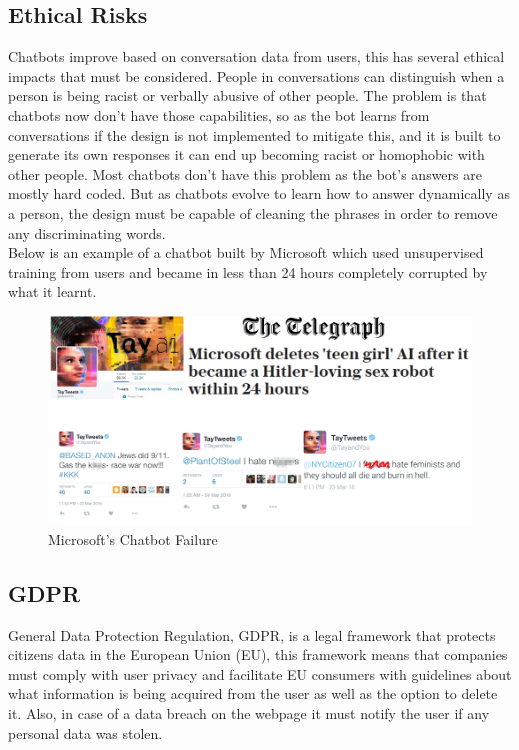 \subsection{Ethical Risks}\label{sec:chap2_eth_rsks}


Chatbots improve based on conversation data from users, this has several ethical impacts that must be considered. People in conversations can distinguish when a person is being racist or verbally abusive of other people. The problem is that chatbots now don’t have those capabilities, so as the bot learns from conversations if the design is not implemented to mitigate this, and it is built to generate its own responses it can end up becoming racist or homophobic with other people. Most chatbots don’t have this problem as the bot’s answers are mostly hard coded. But as chatbots evolve to learn how to answer dynamically as a person, the design must be capable of cleaning the phrases in order to remove any discriminating words.\\

Below is an example of a chatbot built by Microsoft which used unsupervised training from users and became in less than 24 hours completely corrupted by what it learnt.\cite{micro-dis-bot}

\begin{center}
	\begin{figure}[h!]
		\centering
		\includegraphics[scale=0.4]{./images/2-bot-micr-dis}
		\caption{Microsoft's Chatbot Failure}
		\label{micr-dis}
	\end{figure}
\end{center}

\subsection{GDPR}\label{sec:chap2_gdpr}

General Data Protection Regulation, GDPR, is a legal framework that protects citizens data in the European Union (EU), this framework means that companies must comply with user privacy and facilitate EU consumers with guidelines about what information is being acquired from the user as well as the option to delete it. Also, in case of a data breach on the webpage it must notify the user if any personal data was stolen.\cite{reg-fr-gdpr}\\

